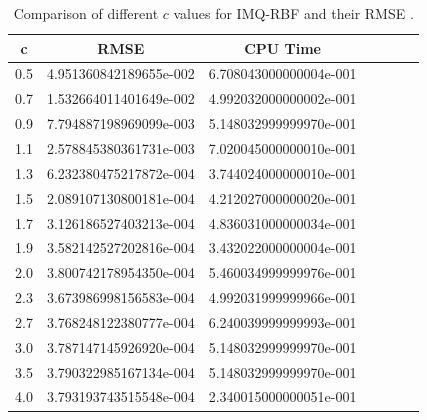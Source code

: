 \documentclass[12pt]{article}
\numberwithin{equation}{subsection} %
\begin{document}
\newpage
\begin{table}[h]
\centering \caption{Comparison of different $c$ values for IMQ-RBF
and their RMSE .}\label{Tab_1DFinal}
\vspace{5mm}
\begin{tabular}{|c|c|c|c|c|c|c|}
  \hline
  c &  RMSE & CPU Time \\
  \hline
  0.5 & 4.951360842189655e-002 & 6.708043000000004e-001   \\
  0.7 & 1.532664011401649e-002  &4.992032000000002e-001  \\
  0.9 &7.794887198969099e-003   & 5.148032999999970e-001  \\
  1.1 &2.578845380361731e-003   &7.020045000000010e-001 \\
  1.3 &6.232380475217872e-004  &3.744024000000010e-001 \\
  1.5 &2.089107130800181e-004   &4.212027000000020e-001  \\
  1.7 &3.126186527403213e-004   & 4.836031000000034e-001  \\
  1.9 &3.582142527202816e-004   &3.432022000000004e-001    \\
  2.0 & 3.800742178954350e-004  &5.460034999999976e-001  \\
  2.3& 3.673986998156583e-004&4.992031999999966e-001\\
  2.7&3.768248122380777e-004&6.240039999999993e-001\\
  3.0&3.787147145926920e-004  &5.148032999999970e-001\\
  3.5&3.790322985167134e-004&5.148032999999970e-001\\
  4.0&3.793193743515548e-004 &2.340015000000051e-001\\

  \hline

\end{tabular}
\end{table}
\end{document}
